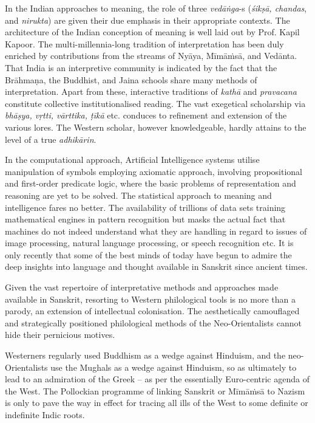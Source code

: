 In the Indian approaches to meaning, the role of three \textit{vedāṅga}-s (\textit{śikṣā, chandas}, and \textit{nirukta}) are given their due emphasis in their appropriate contexts. The architecture of the Indian conception of meaning is well laid out by Prof. Kapil Kapoor. The multi-millennia-long tradition of interpretation has been duly enriched by contributions from the streams of Nyāya, Mīmāṁsā, and Vedānta. That India is an interpretive community is indicated by the fact that the Brāhmaṇa, the Buddhist, and Jaina schools share many methods of interpretation. Apart from these, interactive traditions of \textit{kathā} and \textit{pravacana} constitute collective institutionalised reading. The vast exegetical scholarship via \textit{bhāṣya, vṛtti, vārttika, ṭīkā} etc. conduces to refinement and extension of the various lores. The Western scholar, however knowledgeable, hardly attains to the level of a true \textit{adhikārin}.

In the computational approach, Artificial Intelligence systems utilise manipulation of symbols employing axiomatic approach, involving propositional and first-order predicate logic, where the basic problems of representation and reasoning are yet to be solved. The statistical approach to meaning and intelligence fares no better. The availability of trillions of data sets training mathematical engines in pattern recognition but masks the actual fact that machines do not indeed understand what they are handling in regard to issues of image processing, natural language processing, or speech recognition etc. It is only recently that some of the best minds of today have begun to admire the deep insights into language and thought available in Sanskrit since ancient times.

Given the vast repertoire of interpretative methods and approaches made available in Sanskrit, resorting to Western philological tools is no more than a parody, an extension of intellectual colonisation. The aesthetically camouflaged and strategically positioned philological methods of the Neo-Orientalists cannot hide their pernicious motives.

Westerners regularly used Buddhism as a wedge against Hinduism, and the neo-Orientalists use the Mughals as a wedge against Hinduism, so as ultimately to lead to an admiration of the Greek – as per the essentially Euro-centric agenda of the West. The Pollockian programme of linking Sanskrit or Mīmāṁsā to Nazism is only to pave the way in effect for tracing all ills of the West to some definite or indefinite Indic roots.

